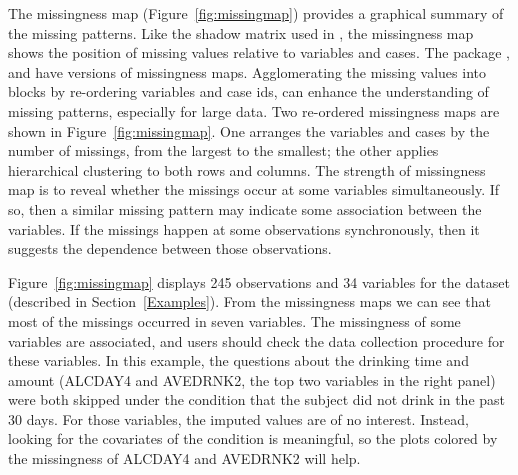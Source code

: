 \documentclass[article]{jss}
\begin{document}
The missingness map (Figure~\ref{fig:missingmap}) provides a graphical summary of the missing patterns. Like the shadow matrix used in , the missingness map shows the position of missing values relative to variables and cases. The  package  \citep{amelia}, and  \citep{VIM} have versions of missingness maps. Agglomerating the missing values into blocks by re-ordering variables and case ids, can enhance the understanding of missing patterns, especially for large data. Two re-ordered missingness maps are shown in Figure~\ref{fig:missingmap}. One arranges the variables and cases by the number of missings, from the largest to the smallest; the other applies hierarchical clustering to both rows and columns. The strength of missingness map is to reveal whether the missings occur at some variables simultaneously. If so, then a similar missing pattern may indicate some association between the variables. If the missings happen at some observations synchronously, then it suggests the dependence between those observations.

Figure~\ref{fig:missingmap} displays 245 observations and 34 variables for the dataset  (described in Section~\ref{Examples}). From the missingness maps we can see that most of the missings occurred in seven variables. The missingness of some variables are associated, and users should check the data collection procedure for these variables. In this example, the questions about the drinking time and amount (ALCDAY4 and AVEDRNK2, the top two variables in the right panel) were both skipped under the condition that the subject did not drink in the past 30 days. For those variables, the imputed values are of no interest. Instead, looking for the covariates of the condition is meaningful, so the plots colored by the missingness of ALCDAY4 and AVEDRNK2 will help.
\end{document}
